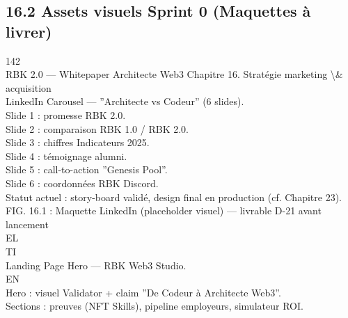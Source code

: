 \documentclass[12pt,landscape,a4paper]{article}
\begin{document}
\subsection{16.2 Assets visuels Sprint 0 (Maquettes à livrer)}
\vspace{0.5em}
\vspace{0.5em}
\vspace{0.5em}
\vspace{0.5em}
142\\
RBK 2.0 — Whitepaper Architecte Web3                                                            Chapitre 16. Stratégie marketing \textbackslash{}& acquisition\\
\vspace{0.5em}
\vspace{0.5em}
\vspace{0.5em}
\vspace{0.5em}
LinkedIn Carousel — ”Architecte vs Codeur” (6 slides).\\
Slide 1 : promesse RBK 2.0.\\
Slide 2 : comparaison RBK 1.0 / RBK 2.0.\\
Slide 3 : chiffres Indicateurs 2025.\\
Slide 4 : témoignage alumni.\\
Slide 5 : call-to-action ”Genesis Pool”.\\
Slide 6 : coordonnées RBK Discord.\\
Statut actuel : story-board validé, design final en production (cf. Chapitre 23).\\
\vspace{0.5em}
FIG. 16.1 : Maquette LinkedIn (placeholder visuel) — livrable D-21 avant lancement\\
\vspace{0.5em}
\vspace{0.5em}
\vspace{0.5em}
\vspace{0.5em}
EL\\
TI\\
Landing Page Hero — RBK Web3 Studio.\\
\vspace{0.5em}
\vspace{0.5em}
\vspace{0.5em}
\vspace{0.5em}
EN\\
Hero : visuel Validator + claim ”De Codeur à Architecte Web3”.\\
Sections : preuves (NFT Skills), pipeline employeurs, simulateur ROI.\\
\end{document}
